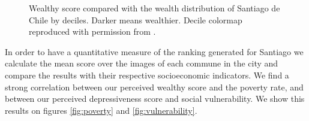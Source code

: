 \begin{figure}[ht]
	\centering
	\caption[Wealthy score vs wealth distribution of Santiago de Chile]{
        Wealthy score compared with the wealth distribution of Santiago de Chile by deciles. Darker means wealthier.
        Decile colormap reproduced  with permission from .
    }
	\label{fig:eod}
\end{figure}

In order to have a quantitative measure of the ranking generated for Santiago we calculate the mean score over
the images of each commune in the city and compare the results with their respective
socioeconomic indicators. We find a strong correlation between our perceived wealthy score
and the poverty rate, and between our perceived depressiveness score and social vulnerability.
We show this results on figures \ref{fig:poverty} and \ref{fig:vulnerability}.

